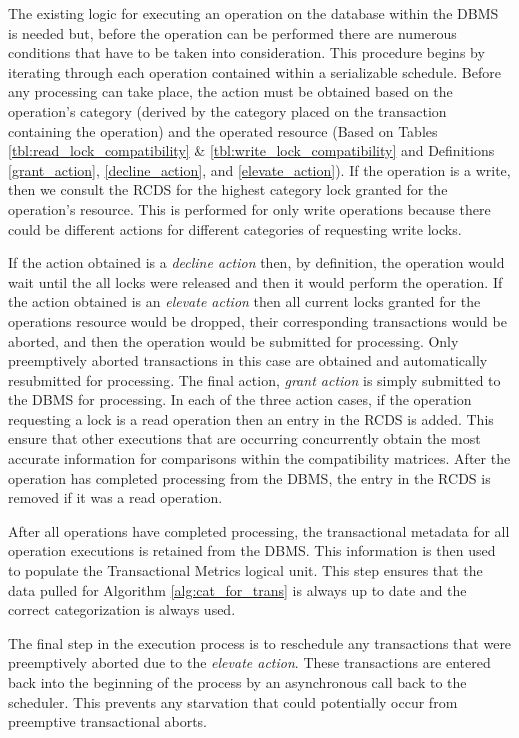 \documentclass[conference]{IEEEtran}
\begin{document}
The existing logic for executing an operation on the database within the DBMS is needed but, before the operation can be performed there are numerous conditions that have to be taken into consideration. This procedure begins by iterating through each operation contained within a serializable schedule. Before any processing can take place, the action must be obtained based on the operation's category (derived by the category placed on the transaction containing the operation) and the operated resource (Based on Tables \ref{tbl:read_lock_compatibility} \& \ref{tbl:write_lock_compatibility} and Definitions \ref{grant_action}, \ref{decline_action}, and \ref{elevate_action}). If the operation is a write, then we consult the RCDS for the highest category lock granted for the operation's resource. This is performed for only write operations because there could be different actions for different categories of requesting write locks.

If the action obtained is a \textit{decline action} then, by definition, the operation would wait until the all locks were released and then it would perform the operation. If the action obtained is an \textit{elevate action} then all current locks granted for the operations resource would be dropped, their corresponding transactions would be aborted, and then the operation would be submitted for processing. Only preemptively aborted transactions in this case are obtained and automatically resubmitted for processing. The final action, \textit{grant action} is simply submitted to the DBMS for processing. In each of the three action cases, if the operation requesting a lock is a read operation then an entry in the RCDS is added. This ensure that other executions that are occurring concurrently obtain the most accurate information for comparisons within the compatibility matrices. After the operation has completed processing from the DBMS, the entry in the RCDS is removed if it was a read operation.

After all operations have completed processing, the transactional metadata for all operation executions is retained from the DBMS. This information is then used to populate the Transactional Metrics logical unit. This step ensures that the data pulled for Algorithm \ref{alg:cat_for_trans} is always up to date and the correct categorization is always used.

The final step in the execution process is to reschedule any transactions that were preemptively aborted due to the \textit{elevate action}. These transactions are entered back into the beginning of the process by an asynchronous call back to the scheduler. This prevents any starvation that could potentially occur from preemptive transactional aborts.
\end{document}
